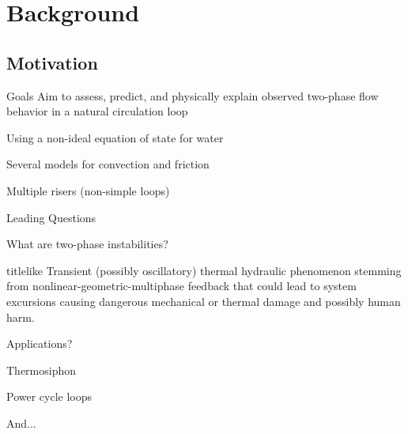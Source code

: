 \section{Background}

    \subsection{Motivation}
    \begin{frame}{Goals}
        Aim to assess, predict, and physically explain observed two-phase flow behavior in a natural circulation loop
        \begin{Itemize}
            \item{Using a non-ideal equation of state for water}
            \item{Several models for convection and friction}
            \item{Multiple risers (non-simple loops)}
        \end{Itemize}
    \end{frame}
    
    \begin{frame}{Leading Questions}
        \begin{Itemize}
            \item<1->{What are two-phase instabilities?}
            \begin{beamercolorbox}[sep=0.4em,rounded=true]{titlelike}
                Transient (possibly oscillatory) thermal hydraulic phenomenon stemming from 
                nonlinear-geometric-multiphase feedback that could lead to system excursions 
                causing dangerous mechanical or thermal damage and possibly human harm.
            \end{beamercolorbox}
            \pause
            \item<2->{Applications?}
                \begin{Itemize}
                    \item<2->{Thermosiphon}
                    \item<2->{Power cycle loops}
                    \item<2->{And... }
                 \end{Itemize}
        \end{Itemize}
    \end{frame}

